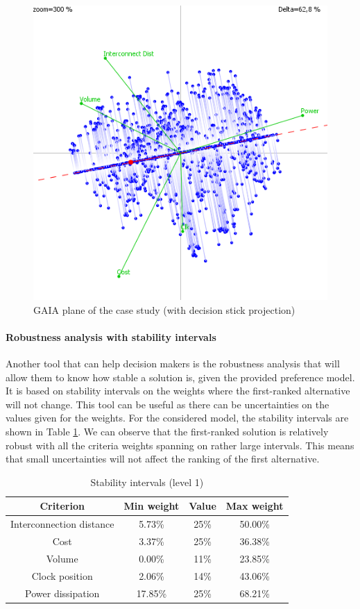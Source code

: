 \begin{figure}[h!]
\begin{center}
\includegraphics[width=0.8\linewidth]{gva804stick}
\end{center}
\caption{GAIA plane of the case study (with decision stick projection)}
\label{fig:gva804stick}
\end{figure}

\paragraph{Robustness analysis with stability intervals}
Another tool that can help decision makers is the robustness analysis that will allow them to know how stable a solution is, given the provided preference model. It is based on stability intervals on the weights where the first-ranked alternative will not change. This tool can be useful as there can be uncertainties on the values given for the weights. For the considered model, the stability intervals are shown in Table \ref{tab:stability}. We can observe that the first-ranked solution is relatively robust with all the criteria weights spanning on rather large intervals. This means that small uncertainties will not affect the ranking of the first alternative.

\begin{table}[h!]
\caption{Stability intervals (level 1)}
\begin{center}
\begin{tabular}{|c|c|c|c|}
\hline
Criterion & Min weight & Value  & Max weight \\
\hline
Interconnection distance & 5.73\% & 25\% & 50.00\% \\
Cost & 3.37\% & 25\% & 36.38\% \\
Volume & 0.00\% & 11\% & 23.85\% \\
Clock position & 2.06\% & 14\% & 43.06\% \\
Power dissipation & 17.85\% & 25\% & 68.21\% \\
\hline
\end{tabular}
\end{center}
\label{tab:stability}
\end{table}

